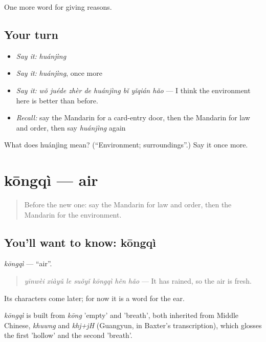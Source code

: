 \begin{grammarlens}[title={What you've built}]
One more word for giving reasons.
\end{grammarlens}

\subsection*{Your turn}
\begin{itemize}
\raggedright
  \item \emph{Say it:} \emph{huánjìng}
  \item \emph{Say it:} \emph{huánjìng}, once more
  \item \emph{Say it:} \emph{wǒ juéde zhèr de huánjìng bǐ yǐqián hǎo} — I think the environment here is better than before.
  \item \emph{Recall:} say the Mandarin for a card-entry door, then the Mandarin for law and order, then say \emph{huánjìng} again
\end{itemize}

\begin{tcolorbox}[breakable,colback=teal!4,colframe=teal!35!black,title={Before you move on}]
What does huánjìng mean? (\textquotedblleft{}Environment; surroundings\textquotedblright{}.) Say it once more.
\end{tcolorbox}
\section[kōngqì]{kōngqì — air}

\label{lesson:ZH-C380-kongqi}



\begin{quote}
Before the new one: say the Mandarin for law and order, then the Mandarin for the environment.
\end{quote}

\subsection*{You'll want to know: kōngqì}
\emph{kōngqì} — \textquotedblleft{}air\textquotedblright{}.

\begin{quote}
\emph{yīnwèi xiàyǔ le suǒyǐ kōngqì hěn hǎo} — It has rained, so the air is fresh.
\end{quote}

Its characters come later; for now it is a word for the ear.

\begin{cousinweb}
\emph{kōngqì} is built from \emph{kōng} 'empty' and  'breath', both inherited from Middle Chinese, \emph{khuwng} and \emph{khj+jH} (Guangyun, in Baxter's transcription), which glosses the first 'hollow' and the second 'breath'.
\end{cousinweb}

